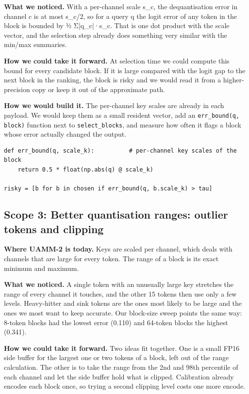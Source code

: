 \documentclass[12pt,a4paper]{report}
\begin{document}
\textbf{What we noticed.} With a per-channel scale s\_\allowbreak{}c, the dequantisation error in channel c is at most s\_\allowbreak{}c/2, so for a query q the logit error of any token in the block is bounded by ½ Σ|q\_\allowbreak{}c|·s\_\allowbreak{}c. That is one dot product with the scale vector, and the selection step already does something very similar with the min/max summaries.

\textbf{How we could take it forward.} At selection time we could compute this bound for every candidate block. If it is large compared with the logit gap to the next block in the ranking, the block is risky and we would read it from a higher-precision copy or keep it out of the approximate path.

\textbf{How we would build it.} The per-channel key scales are already in each payload. We would keep them as a small resident vector, add an \texttt{err\_\allowbreak{}\allowbreak{}bound(q, block)} function next to \texttt{select\_\allowbreak{}\allowbreak{}blocks}, and measure how often it flags a block whose error actually changed the output.

\begin{lstlisting}
def err_bound(q, scale_k):          # per-channel key scales of the block
    return 0.5 * float(np.abs(q) @ scale_k)

risky = [b for b in chosen if err_bound(q, b.scale_k) > tau]
\end{lstlisting}
\subsection{Scope 3: Better quantisation ranges: outlier tokens and clipping}
\textbf{Where UAMM-2 is today.} Keys are scaled per channel, which deals with channels that are large for every token. The range of a block is its exact minimum and maximum.

\textbf{What we noticed.} A single token with an unusually large key stretches the range of every channel it touches, and the other 15 tokens then use only a few levels. Heavy-hitter and sink tokens are the ones most likely to be large and the ones we most want to keep accurate. Our block-size sweep points the same way: 8-token blocks had the lowest error (0.110) and 64-token blocks the highest (0.341).

\textbf{How we could take it forward.} Two ideas fit together. One is a small FP16 side buffer for the largest one or two tokens of a block, left out of the range calculation. The other is to take the range from the 2nd and 98th percentile of each channel and let the side buffer hold what is clipped. Calibration already encodes each block once, so trying a second clipping level costs one more encode.
\end{document}
